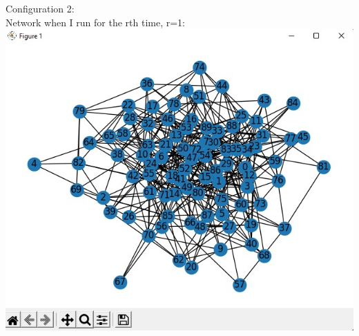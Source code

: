 \documentclass[answers]{exam}
\begin{document}
\begin{questions}
\begin{framed}
Configuration 2:\\Network when I run for the rth time, r=1:\\
\includegraphics[width=10 cm]{sec conf pic 1.jpg}\\


\end{framed}
\end{questions}
\end{document}
